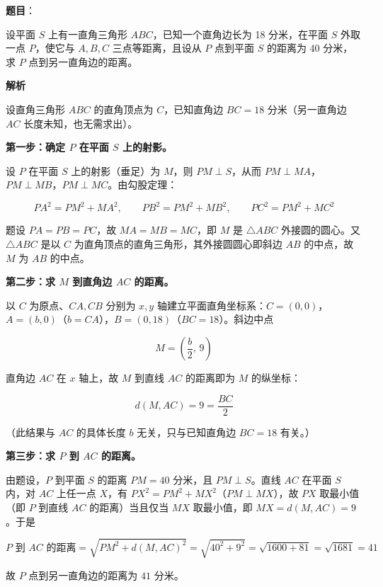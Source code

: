 \begin{answer}

\textbf{题目}：

设平面 $S$ 上有一直角三角形 $ABC$，已知一个直角边长为 18 分米，在平面 $S$ 外取一点 $P$，使它与 $A,B,C$ 三点等距离，且设从 $P$ 点到平面 $S$ 的距离为 40 分米，求 $P$ 点到另一直角边的距离。

\textbf{解析}

设直角三角形 $ABC$ 的直角顶点为 $C$，已知直角边 $BC=18$ 分米（另一直角边 $AC$ 长度未知，也无需求出）。

\textbf{第一步：确定 $P$ 在平面 $S$ 上的射影。}

设 $P$ 在平面 $S$ 上的射影（垂足）为 $M$，则 $PM\perp S$，从而 $PM\perp MA$，$PM\perp MB$，$PM\perp MC$。由勾股定理：

\nopagebreak[4]
\[
PA^2=PM^2+MA^2,\qquad PB^2=PM^2+MB^2,\qquad PC^2=PM^2+MC^2
\]

题设 $PA=PB=PC$，故 $MA=MB=MC$，即 $M$ 是 $\triangle ABC$ 外接圆的圆心。又 $\triangle ABC$ 是以 $C$ 为直角顶点的直角三角形，其外接圆圆心即斜边 $AB$ 的中点，故 $M$ 为 $AB$ 的中点。

\textbf{第二步：求 $M$ 到直角边 $AC$ 的距离。}

以 $C$ 为原点、$CA,CB$ 分别为 $x,y$ 轴建立平面直角坐标系：$C=(0,0)$，$A=(b,0)$（$b=CA$），$B=(0,18)$（$BC=18$）。斜边中点

\nopagebreak[4]
\[
M=\left(\frac b2,\,9\right)
\]

直角边 $AC$ 在 $x$ 轴上，故 $M$ 到直线 $AC$ 的距离即为 $M$ 的纵坐标：

\nopagebreak[4]
\[
d(M,AC)=9=\frac{BC}{2}
\]

（此结果与 $AC$ 的具体长度 $b$ 无关，只与已知直角边 $BC=18$ 有关。）

\textbf{第三步：求 $P$ 到 $AC$ 的距离。}

由题设，$P$ 到平面 $S$ 的距离 $PM=40$ 分米，且 $PM\perp S$。直线 $AC$ 在平面 $S$ 内，对 $AC$ 上任一点 $X$，有 $PX^2=PM^2+MX^2$（$PM\perp MX$），故 $PX$ 取最小值（即 $P$ 到直线 $AC$ 的距离）当且仅当 $MX$ 取最小值，即 $MX=d(M,AC)=9$。于是

\nopagebreak[4]
\[
P\text{ 到 }AC\text{ 的距离}=\sqrt{PM^2+d(M,AC)^2}=\sqrt{40^2+9^2}=\sqrt{1600+81}=\sqrt{1681}=41
\]

故 $P$ 点到另一直角边的距离为 $41$ 分米。


\end{answer}